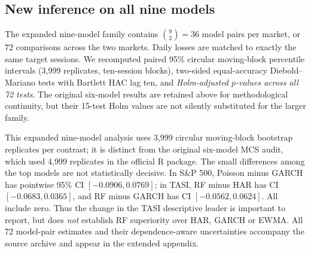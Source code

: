 \subsection{New inference on all nine models}
The expanded nine-model family contains $\binom{9}{2}=36$ model pairs per market, or 72 comparisons across the two markets. Daily losses are matched to exactly the same target sessions. We recomputed paired 95\% circular moving-block percentile intervals (3,999 replicates, ten-session blocks), two-sided equal-accuracy Diebold--Mariano tests with Bartlett HAC lag ten, and \emph{Holm-adjusted $p$-values across all 72 tests}. The original six-model results are retained above for methodological continuity, but their 15-test Holm values are not silently substituted for the larger family.
\begin{table}[htbp]\centering\scriptsize
\caption{Selected contrasts from the complete nine-model family. Negative loss differences favor the first-listed model. Intervals are nominal \emph{pointwise} 95\%, and corrected $p$-values belong to the 72-test family.}\label{tab:dm-expanded}
\end{table}
This expanded nine-model analysis uses 3,999 circular moving-block bootstrap replicates per contrast; it is distinct from the original six-model MCS audit, which used 4,999 replicates in the official R package. The small differences among the top models are not statistically decisive. In S\&P 500, Poisson minus GARCH has pointwise 95\% CI $[-0.0906,0.0769]$; in TASI, RF minus HAR has CI $[-0.0683,0.0365]$, and RF minus GARCH has CI $[-0.0562,0.0624]$. All include zero. Thus the change in the TASI descriptive leader is important to report, but does \emph{not} establish RF superiority over HAR, GARCH or EWMA. All 72 model-pair estimates and their dependence-aware uncertainties accompany the source archive and appear in the extended appendix.

